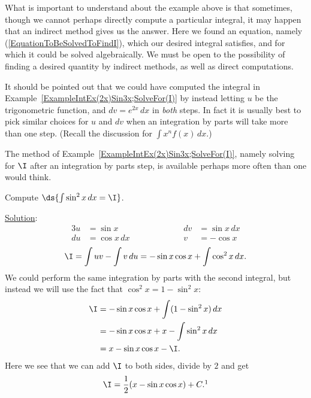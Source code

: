 What is important to understand about the example above is that sometimes,
though we cannot perhaps directly compute a particular integral, it may
happen that an indirect method gives us the answer.  Here we found an
equation, namely (\ref{EquationToBeSolvedToFindI}), which our desired
integral satisfies, and for which it could be solved algebraically.
We must be open to the possibility of finding a desired quantity
by indirect methods, as well as direct computations.

It should be pointed out that we could have computed the integral
in Example~\ref{ExampleIntEx(2x)Sin3x;SolveFor(I)} by instead
letting $u$ be the trigonometric function, and $dv=e^{2x}\,dx$
in {\it both} steps.  In fact it is usually best to pick similar
choices for $u$ and $dv$ when an integration by parts will take
more than one step.  (Recall the discussion for $\int x^nf(x)\,dx$.)

The method of Example~\ref{ExampleIntEx(2x)Sin3x;SolveFor(I)},
namely solving for $\I$ after an integration by parts step, 
is available perhaps more often than one would think.

\bex Compute $\ds{\int \sin^2x\,dx=\I}$.

\underline{Solution}:
\begin{alignat*}{3}
u&=\sin x&&\qquad\qquad&dv&=\sin x\,dx\\
du&=\cos x\,dx&&&v&=-\cos x
\end{alignat*}
$$\I=\int uv-\int v\,du=-\sin x\cos x+\int\cos^2x\,dx.$$
We could perform the same integration by parts with the second
integral, but instead we will use the fact that $\cos^2x=1-\sin^2x$:
\begin{align*}\I&=-\sin x\cos x+\int(1-\sin^2x)\,dx\\
                &=-\sin x\cos x+x-\int\sin^2x\,dx\\
                &=x-\sin x\cos x-\I.\end{align*}
Here we see that we can add $\I$ to both sides, divide by $2$ and get
$$\I=\frac12(x-\sin x\cos x)+C.\footnotemark$$
\label{FirstPartsIntegrationOfSinSquaredX}
\eex

